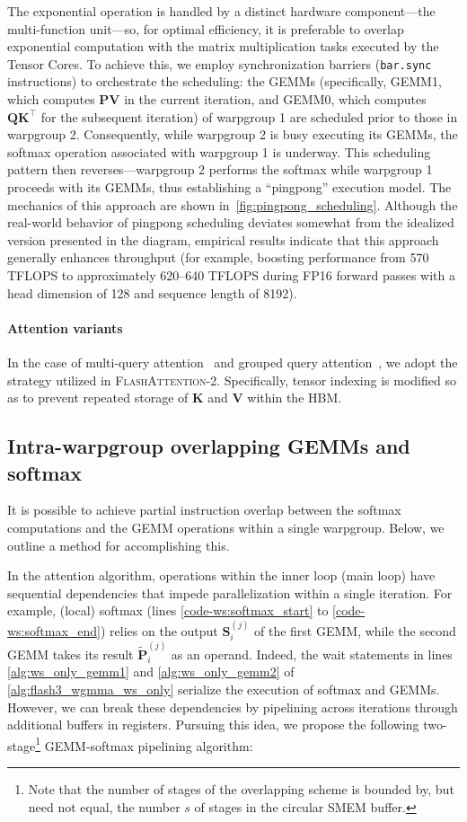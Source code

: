 The exponential operation is handled by a distinct hardware component—the multi-function unit—so, for optimal efficiency, it is preferable to overlap exponential computation with the matrix multiplication tasks executed by the Tensor Cores. To achieve this, we employ synchronization barriers (\texttt{bar.sync} instructions) to orchestrate the scheduling: the GEMMs (specifically, GEMM1, which computes $\mathbf{P} \mathbf{V}$ in the current iteration, and GEMM0, which computes $\mathbf{Q} \mathbf{K}^\top$ for the subsequent iteration) of warpgroup 1 are scheduled prior to those in warpgroup 2. Consequently, while warpgroup 2 is busy executing its GEMMs, the softmax operation associated with warpgroup 1 is underway. This scheduling pattern then reverses—warpgroup 2 performs the softmax while warpgroup 1 proceeds with its GEMMs, thus establishing a “pingpong” execution model. The mechanics of this approach are shown in~\cref{fig:pingpong_scheduling}. Although the real-world behavior of pingpong scheduling deviates somewhat from the idealized version presented in the diagram, empirical results indicate that this approach generally enhances throughput (for example, boosting performance from 570 TFLOPS to approximately 620–640 TFLOPS during FP16 forward passes with a head dimension of 128 and sequence length of 8192).

\paragraph{Attention variants} In the case of multi-query attention~\citep{shazeer2019fast} and grouped query attention~\citep{ainslie2023gqa}, we adopt the strategy utilized in \textsc{FlashAttention-2}. Specifically, tensor indexing is modified so as to prevent repeated storage of $\mathbf{K}$ and $\mathbf{V}$ within the HBM.

\subsection{Intra-warpgroup overlapping GEMMs and softmax}

It is possible to achieve partial instruction overlap between the softmax computations and the GEMM operations within a single warpgroup. Below, we outline a method for accomplishing this.

In the attention algorithm, operations within the inner loop (main loop) have sequential dependencies that impede parallelization within a single iteration. For example, (local) softmax (lines \ref{code-ws:softmax_start} to \ref{code-ws:softmax_end}) relies on the output $\mathbf{S}_i^{(j)}$ of the first GEMM, while the second GEMM takes its result $\widetilde{\mathbf{P}}_i^{(j)}$ as an operand. Indeed, the wait statements in lines \ref{alg:ws_only_gemm1} and \ref{alg:ws_only_gemm2} of \cref{alg:flash3_wgmma_ws_only} serialize the execution of softmax and GEMMs. However, we can break these dependencies by pipelining across iterations through additional buffers in registers. Pursuing this idea, we propose the following two-stage\footnote{Note that the number of stages of the overlapping scheme is bounded by, but need not equal, the number $s$ of stages in the circular SMEM buffer.} GEMM-softmax pipelining algorithm:


